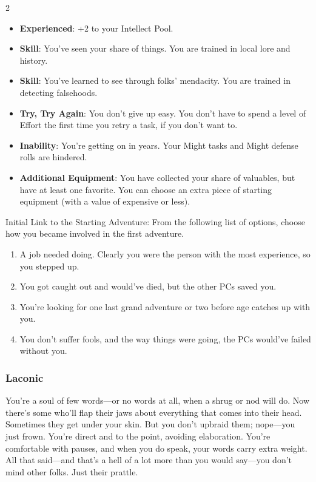 \begin{multicols}{2}
\begin{itemize}
\item \textbf{Experienced}: +2 to your Intellect Pool. 
\item \textbf{Skill}: You’ve seen your share of things. You are trained in local lore and history. 
\item \textbf{Skill}: You’ve learned to see through folks’ mendacity. You are trained in detecting falsehoods. 
\item \textbf{Try, Try Again}: You don’t give up easy. You don’t have to spend a level of Effort the first time you retry a task, if you don’t want to. 
\item \textbf{Inability}: You’re getting on in years. Your Might tasks and Might defense rolls are hindered. 
\item \textbf{Additional Equipment}: You have collected your share of valuables, but have at least one favorite. You can choose an extra piece of starting equipment (with a value of expensive or less).
\end{itemize}
Initial Link to the Starting Adventure: From the following list of options, choose how you became involved in the first adventure. 
\begin{enumerate}
\item A job needed doing. Clearly you were the person with the most experience, so you stepped up. 
\item You got caught out and would’ve died, but the other PCs saved you. 
\item You’re looking for one last grand adventure or two before age catches up with you. 
\item You don’t suffer fools, and the way things were going, the PCs would’ve failed without you.
\end{enumerate}

\subsubsection{Laconic}

You’re a soul of few words—or no words at all, when a shrug or nod will do. Now there’s some who’ll flap their jaws about everything that comes into their head. Sometimes they get under your skin. But you don’t upbraid them; nope—you just frown. You’re direct and to the point, avoiding elaboration. You’re comfortable with pauses, and when you do speak, your words carry extra weight. All that said—and that’s a hell of a lot more than you would say—you don’t mind other folks. Just their prattle.


\end{multicols}
